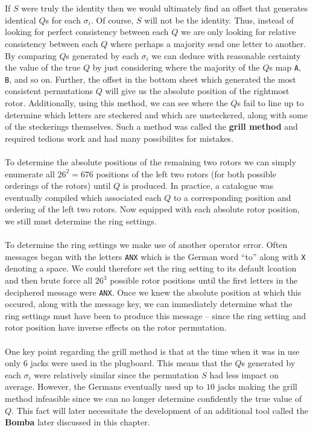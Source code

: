 \\\\If $S$ were truly the identity then we would ultimately find an offset that generates identical $Q$s for each $\sigma_i$. Of course, $S$ will not be the identity. Thus, instead of looking for perfect consistency between each $Q$ we are only looking for relative consistency between each $Q$ where perhaps a majority send one letter to another. By comparing $Q$s generated by each $\sigma_i$ we can deduce with reasonable certainty the value of the true $Q$ by just considering where the majority of the $Q$s map \texttt{A}, \texttt{B}, and so on. Further, the offset in the bottom sheet which generated the most consistent permutations $Q$ will give us the absolute position of the rightmost rotor. Additionally, using this method, we can see where the $Q$s fail to line up to determine which letters are steckered and which are unsteckered, along with some of the steckerings themselves. Such a method was called the {\bf{grill method}} and required tedious work and had many possibilites for mistakes.
\\\\To determine the absolute positions of the remaining two rotors we can simply enumerate all $26^2 = 676$ positions of the left two rotors (for both possible orderings of the rotors) until $Q$ is produced. In practice, a catalogue was eventually compiled which associated each $Q$ to a corresponding position and ordering of the left two rotors. Now equipped with each absolute rotor position, we still must determine the ring settings.
\\\\To determine the ring settings we make use of another operator error. Often messages began with the letters \texttt{ANX} which is the German word ``to'' along with \texttt{X} denoting a space. We could therefore set the ring setting to its default lcoation and then brute force all $26^3$ possible rotor positions until the first letters in the deciphered message were \texttt{ANX}. Once we knew the absolute position at which this occured, along with the message key, we can immediately determine what the ring settings must have been to produce this message -- since the ring setting and rotor position have inverse effects on the rotor permutation.
\\\\One key point regarding the grill method is that at the time when it was in use only $6$ jacks were used in the plugboard. This means that the $Q$s generated by each $\sigma_i$ were relatively similar since the permutation $S$ had less impact on average. However, the Germans eventually used up to $10$ jacks making the grill method infeasible since we can no longer determine confidently the true value of $Q$. This fact will later necessitate the development of an additional tool called the {\bf{Bomba}} later discussed in this chapter.

